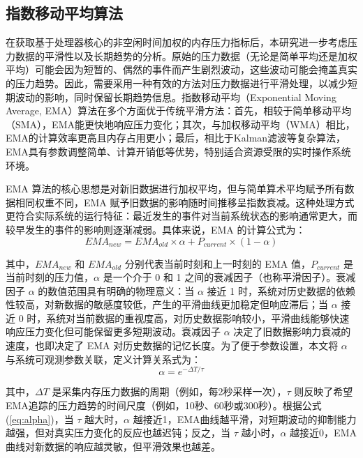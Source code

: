 \subsection{指数移动平均算法}
\label{sec:exponential_smoothing}
在获取基于处理器核心的非空闲时间加权的内存压力指标后，本研究进一步考虑压力数据的平滑性以及长期趋势的分析。原始的压力数据（无论是简单平均还是加权平均）可能会因为短暂的、偶然的事件而产生剧烈波动，这些波动可能会掩盖真实的压力趋势。因此，需要采用一种有效的方法对压力数据进行平滑处理，以减少短期波动的影响，同时保留长期趋势信息。指数移动平均（Exponential Moving Average, EMA）算法在多个方面优于传统平滑方法：首先，相较于简单移动平均（SMA），EMA能更快地响应压力变化；其次，与加权移动平均（WMA）相比，EMA的计算效率更高且内存占用更小；最后，相比于Kalman滤波等复杂算法，EMA具有参数调整简单、计算开销低等优势，特别适合资源受限的实时操作系统环境。

EMA 算法的核心思想是对新旧数据进行加权平均，但与简单算术平均赋予所有数据相同权重不同，EMA 赋予旧数据的影响随时间推移呈指数衰减。这种处理方式更符合实际系统的运行特征：最近发生的事件对当前系统状态的影响通常更大，而较早发生的事件的影响则逐渐减弱。具体来说，EMA 的计算公式为：
\begin{equation}
    EMA_{new} = EMA_{old} \times \alpha + P_{current} \times (1 - \alpha)
    \label{eq:EMA}
\end{equation}

其中，\(EMA_{new}\) 和 \(EMA_{old}\) 分别代表当前时刻和上一时刻的 EMA 值，\(P_{current}\) 是当前时刻的压力值，\(\alpha\) 是一个介于 0 和 1 之间的衰减因子（也称平滑因子）。衰减因子 \(\alpha\) 的数值范围具有明确的物理意义：当 \(\alpha\) 接近 1 时，系统对历史数据的依赖性较高，对新数据的敏感度较低，产生的平滑曲线更加稳定但响应滞后；当 \(\alpha\) 接近 0 时，系统对当前数据的重视度高，对历史数据影响较小，平滑曲线能够快速响应压力变化但可能保留更多短期波动。衰减因子 \(\alpha\) 决定了旧数据影响力衰减的速度，也即决定了 EMA 对历史数据的记忆长度。为了便于参数设置，本文将 \(\alpha\) 与系统可观测参数关联，定义计算关系式为：
\begin{equation}
\alpha = e^{-\Delta T / \tau}
\label{eq:alpha}
\end{equation}

其中，\(\Delta T\) 是采集内存压力数据的周期（例如，每2秒采样一次），\(\tau\) 则反映了希望EMA追踪的压力趋势的时间尺度（例如，10秒、60秒或300秒）。根据公式(\ref{eq:alpha})，当 \(\tau\) 越大时，\(\alpha\) 越接近1，EMA曲线越平滑，对短期波动的抑制能力越强，但对真实压力变化的反应也越迟钝；反之，当 \(\tau\) 越小时，\(\alpha\) 越接近0，EMA曲线对新数据的响应越灵敏，但平滑效果也越差。

